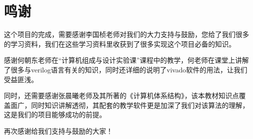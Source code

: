 \documentclass[twoside]{article}
\begin{document}
\section{鸣谢}
这个项目的完成，需要感谢李国桢老师对我们的大力支持与鼓励，您给了我们很多的学习资料，我们在这些学习资料里收获到了很多实现这个项目必备的知识。

感谢何朝东老师在“计算机组成与设计实验课”课程中的教学，何老师在课堂上讲解了很多与verilog语言有关的知识，同时还详细的说明了vivado软件的用法，让我们受益匪浅。

同时，还需要感谢张晨曦老师及其所著的《计算机体系结构》，该本教材知识点覆盖面广，同时知识讲解透彻，其配套的教学软件更是加深了我们对该算法的理解，这是我们的项目能够成功的前提。

再次感谢给我们支持与鼓励的大家！




\end{document}
